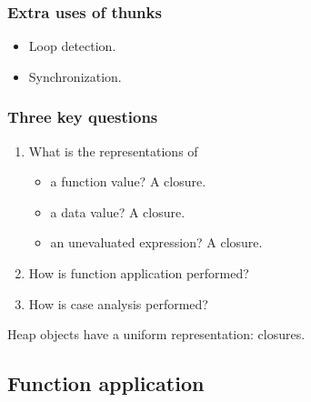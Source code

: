 \documentclass{beamer}
\begin{document}
\begin{frame}
    \frametitle{Extra uses of thunks}

    \begin{itemize}
        \item Loop detection.
        \item Synchronization.
    \end{itemize}
\end{frame}

\begin{frame}
    \frametitle{Three key questions}

    \begin{enumerate}
        \item What is the representations of
            \begin{itemize}
                \item a function value? \alert{A closure.}
                \item a data value? \alert{A closure.}
                \item an unevaluated expression? \alert{A closure.}
            \end{itemize}

        \item How is function application performed?

        \item How is case analysis performed?
    \end{enumerate}

    \pause

    \huge{Heap objects have a uniform representation: \alert{closures}.}
\end{frame}

\subsection{Function application}

\end{document}
